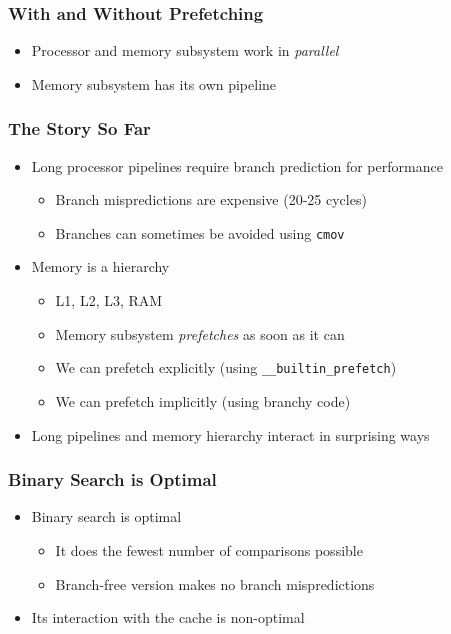 \documentclass[xcolor=dvipsnames]{beamer}
\begin{document}
\begin{frame}[fragile]
   \frametitle{With and Without Prefetching}

   \begin{center}
   \end{center}
   \begin{itemize}[<+->]
     \item Processor and memory subsystem work in \emph{parallel}
     \item Memory subsystem has its own pipeline
   \end{itemize}
\end{frame}


\begin{frame}[fragile]
   \frametitle{The Story So Far}

   \begin{itemize}
      \item<+->Long processor pipelines require branch prediction
               for performance
      \begin{itemize}
         \item<+->Branch mispredictions are expensive (20-25 cycles)
         \item<+->Branches can sometimes be avoided using 
                  \texttt{cmov}
      \end{itemize}
      \item<+->Memory is a hierarchy
      \begin{itemize}
         \item<+->L1, L2, L3, RAM%
            \only<+->{,\ldots}
         \item<+->Memory subsystem \emph{prefetches} as soon as it can
         \item<+->We can prefetch explicitly (using \texttt{__builtin_prefetch})
         \item<+->We can prefetch implicitly (using branchy code)
      \end{itemize}
      \item<+->Long pipelines and memory hierarchy interact in surprising
               ways
   \end{itemize}
\end{frame}


\begin{frame}
   \frametitle{Binary Search is Optimal}

   \begin{itemize}
     \item<+-> Binary search is optimal 
     \begin{itemize}
       \item It does the fewest number of comparisons possible
       \item Branch-free version makes no branch mispredictions
     \end{itemize}
     \item<+-> Its interaction with the cache is non-optimal
   \end{itemize}
\end{frame}
\end{document}
